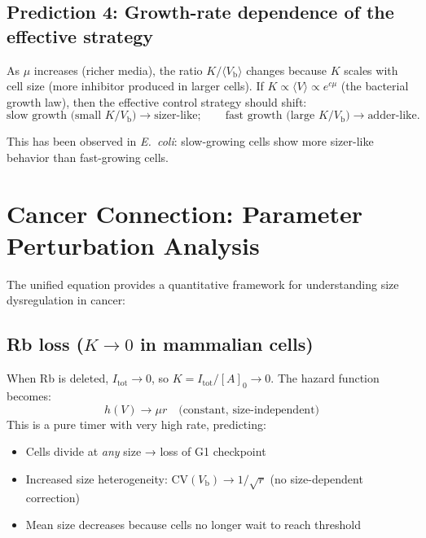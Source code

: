 \documentclass[11pt]{article}
\newcommand{\Vb}{V_{\mathrm{b}}}
\newcommand{\CV}{\mathrm{CV}}
\begin{document}
\subsection{Prediction 4: Growth-rate dependence of the effective strategy}

As $\mu$ increases (richer media), the ratio $K/\langle\Vb\rangle$ changes because $K$ scales with cell size (more inhibitor produced in larger cells). If $K \propto \langle V\rangle \propto e^{c\mu}$ (the bacterial growth law), then the effective control strategy should shift:
\begin{equation}
  \text{slow growth (small $K/\Vb$)} \to \text{sizer-like}; \qquad
  \text{fast growth (large $K/\Vb$)} \to \text{adder-like}.
\end{equation}

This has been observed in \textit{E.\ coli}: slow-growing cells show more sizer-like behavior than fast-growing cells.

\section{Cancer Connection: Parameter Perturbation Analysis}

The unified equation provides a quantitative framework for understanding size dysregulation in cancer:

\subsection{Rb loss ($K \to 0$ in mammalian cells)}

When Rb is deleted, $I_{\mathrm{tot}} \to 0$, so $K = I_{\mathrm{tot}}/[A]_0 \to 0$. The hazard function becomes:
\begin{equation}
  h(V) \to \mu r \quad \text{(constant, size-independent)}
\end{equation}
This is a pure timer with very high rate, predicting:
\begin{itemize}
  \item Cells divide at \emph{any} size → loss of G1 checkpoint
  \item Increased size heterogeneity: $\CV(\Vb) \to 1/\sqrt{r}$ (no size-dependent correction)
  \item Mean size decreases because cells no longer wait to reach threshold
\end{itemize}
\end{document}
